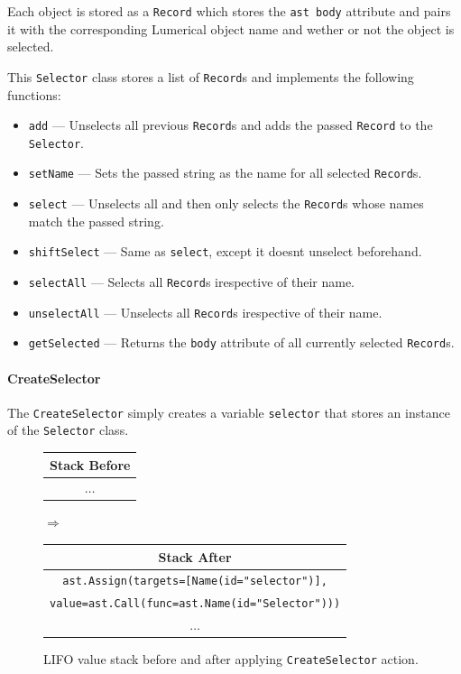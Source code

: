 Each object is stored as a \texttt{Record} which stores the \texttt{ast body} attribute and pairs it with the corresponding Lumerical object name and wether or not the object is selected. 

This \texttt{Selector} class stores a list of \texttt{Record}s and implements the following functions:
\begin{itemize}
  \item \texttt{add} --- Unselects all previous \texttt{Record}s and adds the passed \texttt{Record} to the \texttt{Selector}.
  \item \texttt{setName} --- Sets the passed string as the name for all selected \texttt{Record}s.
  \item \texttt{select} --- Unselects all and then only selects the \texttt{Record}s whose names match the passed string.
  \item \texttt{shiftSelect} --- Same as \texttt{select}, except it doesnt unselect beforehand.
  \item \texttt{selectAll} --- Selects all \texttt{Record}s irespective of their name.
  \item \texttt{unselectAll} --- Unselects all \texttt{Record}s irespective of their name.
  \item \texttt{getSelected} --- Returns the \texttt{body} attribute of all currently selected \texttt{Record}s.
\end{itemize}


\paragraph{CreateSelector}
The \texttt{CreateSelector} simply creates a variable \texttt{selector} that stores an instance of the \texttt{Selector} class.

\begin{figure}[H]\label{fig:createselector-stack}
  \centering
  {\small
  \begin{tabular}{|c|}
    \hline
    \textbf{Stack Before} \\ \hline
    \(\dots\) \\ \hline
  \end{tabular}
  \hspace{0.25em}$\Longrightarrow$\hspace{0.25em}
  \begin{tabular}{|c|}
    \hline
    \textbf{Stack After} \\ \hline
    \texttt{\tiny{ast.}}\texttt{Assign(targets=[Name(id="selector")],}\\
    \texttt{value=}\texttt{\tiny{ast.}}\texttt{Call(func=}\texttt{\tiny{ast.}}\texttt{Name(id="Selector")))} \\ \hline
    \(\dots\) \\ \hline
  \end{tabular}
  }
  \caption{LIFO value stack before and after applying \texttt{CreateSelector} action.}
  
\end{figure}


